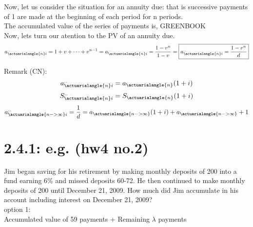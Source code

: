 \documentclass[12pt]{article}
\begin{document}
Now, let us consider the situation for an annuity due: that is successive payments
of 1 are made at the beginning of each period for n periods.\\

The accumulated value of the series of payments is, GREENBOOK\\

Now, lets turn our atention to the PV of an annuity due.\\
	$$
	a^{..}_{\actuarialangle{n}i} = 1+v+\cdots+v^{n-1}=\\
	a^{..}_{\actuarialangle{n}i} = \frac{1-v^n}{1-v}=\\
	\boxed{a^{..}_{\actuarialangle{n}i} = \frac{1-v^n}{d}}\\
	$$

Remark (CN):\\
$$
a^{..}_{\actuarialangle{n}i} = a_{\actuarialangle{n}}(1+i)\\
$$
$$
S^{..}_{\actuarialangle{n}i} = S_{\actuarialangle{n}}(1+i)\\
$$
$$
a^{..}_{\actuarialangle{n->\infty}i} = \frac{1}{d} = a_{\actuarialangle{n->\infty}}(1+i)+a_{\actuarialangle{n->\infty}
}+1\\
$$
\section{2.4.1: e.g. (hw4 no.2)} 
Jim began saving for his retirement by making monthly deposits of 200 into a fund earning 6\%
and missed deposits 60-72. He then continued to make monthly deposits of 200 until December 21,
2009. How much did Jim accumulate in his account including interest on December 21, 2009?\\

option 1:\\
Accumulated value of 59 payments + Remaining $\lambda$ payments \\











 

 
 
\end{document}
